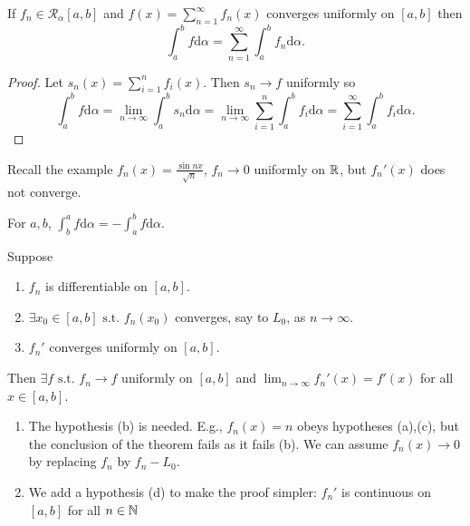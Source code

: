 \begin{corollary*}
	If $f_{n} \in \mathscr{R}_{\alpha}[a,b]$ and $f(x)=\sum_{n=1}^{\infty}{f_{n}(x)}$ converges uniformly on $[a,b]$ then \[
		\int_{a}^{b}{f\mathrm{d}\alpha}=\sum_{n=1}^{\infty}{\int_{a}^{b}{f_{n}\mathrm{d}\alpha}}
		.\]
	\begin{proof}
		Let $s_{n}(x)=\sum_{i=1}^{n}{f_{i}(x)}$. Then $s_{n}\to f$ uniformly so \[
			\int_{a}^{b}{f\mathrm{d}\alpha}=\lim_{n\to \infty}{\int_{a}^{b}{s_{n}\mathrm{d}\alpha}}=\lim_{n\to \infty}{\sum_{i=1}^{n}{\int_{a}^{b}{f_{i}\mathrm{d}\alpha}}}=\sum_{i=1}^{\infty}{\int_{a}^{b}{f_{i}\mathrm{d}\alpha}}
			.\]
	\end{proof}
	\begin{note}
		Recall the example $f_{n}(x)=\frac{\sin{nx}}{\sqrt{n}}$, $f_{n}\to 0$ uniformly on $\mathbb{R}$, but $f_{n}'(x)$ does not converge.
	\end{note}
\end{corollary*}
\begin{notation}
	For $a,b$, $\int_{b}^{a}{f\mathrm{d}\alpha}=-\int_{a}^{b}{f\mathrm{d}\alpha}$.
\end{notation}
\begin{thm}[17]
	Suppose
	\begin{enumerate}
		\item $f_{n}$ is differentiable on $[a,b]$.
		\item $\exists{x_0 \in [a,b]} \text{ s.t. } f_{n}(x_0)$ converges, say to $L_0$, as $n\to \infty$.
		\item $f_{n}'$ converges uniformly on $[a,b]$.
	\end{enumerate}
	Then $\exists f \text{ s.t. } f_{n}\to f$ uniformly on $[a,b]$ and $\lim_{n\to \infty}{f_{n}'(x)}=f'(x)$ for all $x \in [a,b]$.
	\begin{remark}
		\begin{enumerate}[label=\arabic*.]
			\item The hypothesis (b) is needed. E.g., $f_{n}(x)=n$ obeys hypotheses (a),(c), but the conclusion of the theorem fails as it fails (b).
			      We can assume $f_{n}(x)\to 0$ by replacing $f_{n}$ by $f_{n}-L_0$.
			\item We add a hypothesis (d) to make the proof simpler: $f_n'$ is continuous on $[a,b]$ for all $n \in \mathbb{N}$
		\end{enumerate}
	\end{remark}
\end{thm}
